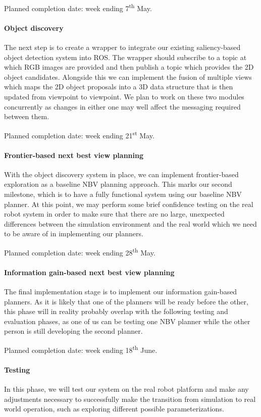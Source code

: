 \documentclass[a4paper,11pt,english]{article}
\begin{document}
Planned completion date: week ending 7\textsuperscript{th} May.

\paragraph{Object discovery}
The next step is to create a wrapper to integrate our existing saliency-based object detection system into ROS.
The wrapper should subscribe to a topic at which RGB images are provided and then publish a topic which provides the 2D object candidates.
Alongside this we can implement the fusion of multiple views which maps the 2D object proposals into a 3D data structure that is then updated from viewpoint to viewpoint.
We plan to work on these two modules concurrently as changes in either one may well affect the messaging required between them.

Planned completion date: week ending 21\textsuperscript{st} May.

\paragraph{Frontier-based next best view planning}
With the object discovery system in place, we can implement frontier-based exploration as a baseline NBV planning approach.
This marks our second milestone, which is to have a fully functional system using our baseline NBV planner.
At this point, we may perform some brief confidence testing on the real robot system in order to make sure that there are no large, unexpected differences between the simulation environment and the real world which we need to be aware of in implementing our planners.

Planned completion date: week ending 28\textsuperscript{th} May.

\pagebreak
\paragraph{Information gain-based next best view planning}
The final implementation stage is to implement our information gain-based planners.
As it is likely that one of the planners will be ready before the other, this phase will in reality probably overlap with the following testing and evaluation phases, as one of us can be testing one NBV planner while the other person is still developing the second planner.

Planned completion date: week ending 18\textsuperscript{th} June.

\paragraph{Testing}
In this phase, we will test our system on the real robot platform and make any adjustments necessary to successfully make the transition from simulation to real world operation, such as exploring different possible parameterizations.
\end{document}
